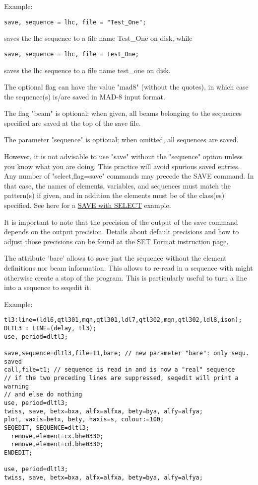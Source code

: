Example:
\begin{verbatim}
save, sequence = lhc, file = "Test_One";
\end{verbatim}
saves the lhc sequence to a file name Test\_One on disk, while
\begin{verbatim}
save, sequence = lhc, file = Test_One;
\end{verbatim}
saves the lhc sequence to a file name test\_one on disk.

The optional
flag can have the value "mad8" (without the quotes), in which case the
sequence(s) is/are saved in MAD-8 input format.  

The flag "beam" is optional; when given, all beams belonging to the
sequences specified are saved at the top of the save file.  

The parameter "sequence" is optional; when omitted, all sequences are
saved.  

However, it is not advisable to use "save" without the "sequence" option
unless you know what you are doing. This practice will avoid spurious
saved entries.    Any number of "select,flag=save" commands may precede
the SAVE command. In that case, the names of elements, variables, and
sequences must match the pattern(s) if given, and in addition the
elements must be of the class(es) specified. See here for a
\href{../Introduction/select.html#save_select}{SAVE with SELECT}
example.  

It is important to note that the precision of the output of the save
command depends on the output precision. Details about default
precisions and how to adjust those precisions can be found at the
\href{../Introduction/set.html#Format}{SET Format} instruction page.   
 
The attribute 'bare' allows to save just the sequence without the
element definitions nor beam information. This allows to re-read in a
sequence with might otherwise create a stop of the program. This is
particularly useful to turn a line into a sequence to seqedit
it. 

Example:  
\begin{verbatim}
tl3:line=(ldl6,qtl301,mqn,qtl301,ldl7,qtl302,mqn,qtl302,ldl8,ison);
DLTL3 : LINE=(delay, tl3);
use, period=dltl3;

save,sequence=dltl3,file=t1,bare; // new parameter "bare": only sequ. saved
call,file=t1; // sequence is read in and is now a "real" sequence
// if the two preceding lines are suppressed, seqedit will print a warning
// and else do nothing
use, period=dltl3;
twiss, save, betx=bxa, alfx=alfxa, bety=bya, alfy=alfya;
plot, vaxis=betx, bety, haxis=s, colour:=100;
SEQEDIT, SEQUENCE=dltl3;
  remove,element=cx.bhe0330;
  remove,element=cd.bhe0330;
ENDEDIT;

use, period=dltl3;
twiss, save, betx=bxa, alfx=alfxa, bety=bya, alfy=alfya;
\end{verbatim}

